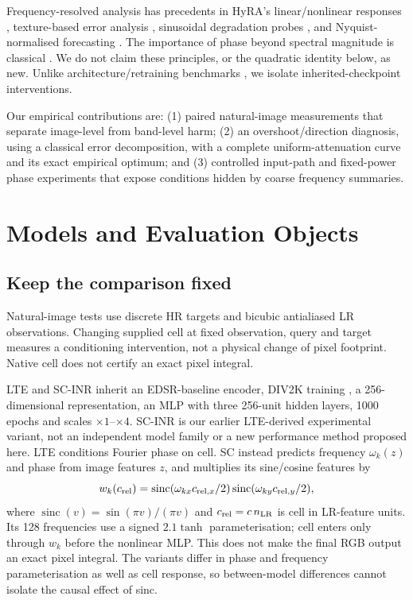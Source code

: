 Frequency-resolved analysis has precedents in HyRA's linear/nonlinear
responses \cite{fsds2024}, texture-based error analysis
\cite{magid2022texture}, sinusoidal degradation probes
\cite{kawai2026frequency}, and Nyquist-normalised forecasting
\cite{wang2026scaleanchoring}. The importance of phase beyond spectral
magnitude is classical \cite{oppenheim1981phase}. We do not claim these
principles, or the quadratic identity below, as new. Unlike architecture/retraining benchmarks \cite{nasir2026empirical},
we isolate inherited-checkpoint interventions.

Our empirical contributions are: (1) paired natural-image
measurements that separate image-level from band-level harm; (2) an
overshoot/direction diagnosis, using a classical error decomposition, with
a complete uniform-attenuation curve and its exact empirical optimum; and (3) controlled
input-path and fixed-power phase experiments that expose conditions hidden
by coarse frequency summaries. 

\section{Models and Evaluation Objects}
\label{sec:recovery}
\subsection{Keep the comparison fixed}
Natural-image tests use discrete HR targets and bicubic antialiased
LR observations. Changing supplied cell at fixed observation, query and
target measures a conditioning intervention, not a physical change of
pixel footprint. Native cell does not certify an exact pixel integral.

LTE and SC-INR inherit an EDSR-baseline encoder, DIV2K training
\cite{agustsson2017div2k}, a 256-dimensional representation, an MLP with three
256-unit hidden layers, 1000 epochs and scales $\times1$--$\times4$.
SC-INR is our earlier LTE-derived experimental variant, not an independent
model family or a new performance method proposed here. LTE conditions
Fourier phase on cell. SC instead predicts frequency $\omega_k(z)$ and
phase from image features $z$, and multiplies its sine/cosine features by
\begin{equation}
 w_k(c_{\rm rel})=\operatorname{sinc}(\omega_{kx}c_{{\rm rel},x}/2)
        \operatorname{sinc}(\omega_{ky}c_{{\rm rel},y}/2),
 \label{eq:sc}
\end{equation}
where $\operatorname{sinc}(v)=\sin(\pi v)/(\pi v)$ and
$c_{\rm rel}=c\,n_{\rm LR}$ is cell in LR-feature units. Its 128 frequencies use a signed $2.1\tanh$ parameterisation;
cell enters only through $w_k$ before the nonlinear MLP. This does not
make the final RGB output an exact pixel integral. The variants differ
in phase and frequency parameterisation as well as cell response, so
between-model differences cannot isolate the causal effect of sinc.

